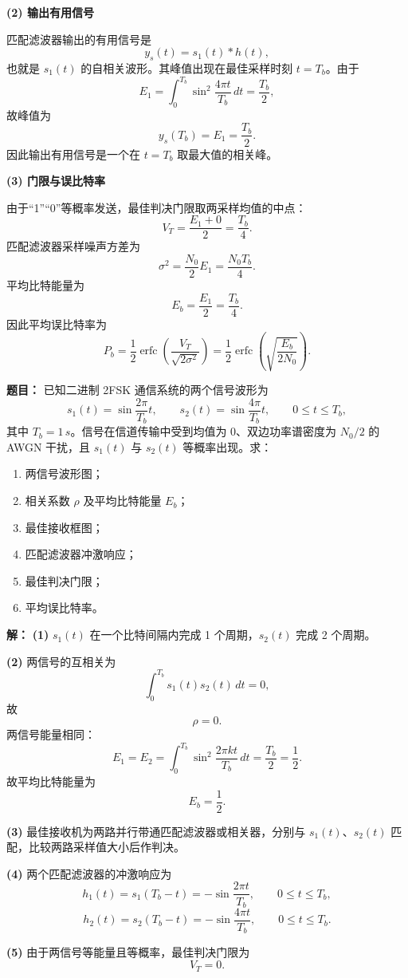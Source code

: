 \textbf{(2) 输出有用信号}\par
匹配滤波器输出的有用信号是
\[
y_s(t)=s_1(t)*h(t),
\]
也就是 $s_1(t)$ 的自相关波形。其峰值出现在最佳采样时刻 $t=T_b$。由于
\[
E_1=\int_0^{T_b}\sin^2\frac{4\pi t}{T_b}\,dt=\frac{T_b}{2},
\]
故峰值为
\[
y_s(T_b)=E_1=\frac{T_b}{2}.
\]
因此输出有用信号是一个在 $t=T_b$ 取最大值的相关峰。

\textbf{(3) 门限与误比特率}\par
由于“1”“0”等概率发送，最佳判决门限取两采样均值的中点：
\[
V_T=\frac{E_1+0}{2}=\frac{T_b}{4}.
\]
匹配滤波器采样噪声方差为
\[
\sigma^2=\frac{N_0}{2}E_1=\frac{N_0T_b}{4}.
\]
平均比特能量为
\[
E_b=\frac{E_1}{2}=\frac{T_b}{4}.
\]
因此平均误比特率为
\[
P_b=\frac12\operatorname{erfc}\!\left(\frac{V_T}{\sqrt{2\sigma^2}}\right)
=\frac12\operatorname{erfc}\!\left(\sqrt{\frac{E_b}{2N_0}}\right).
\]

\medskip
{}
\textbf{题目：}
已知二进制 2FSK 通信系统的两个信号波形为
\[
s_1(t)=\sin\frac{2\pi}{T_b}t,\qquad
s_2(t)=\sin\frac{4\pi}{T_b}t,
\qquad 0\le t\le T_b,
\]
其中 $T_b=1\,s$。信号在信道传输中受到均值为 $0$、双边功率谱密度为 $N_0/2$ 的 AWGN 干扰，且 $s_1(t)$ 与 $s_2(t)$ 等概率出现。求：
\begin{enumerate}
\item 两信号波形图；
\item 相关系数 $\rho$ 及平均比特能量 $E_b$；
\item 最佳接收框图；
\item 匹配滤波器冲激响应；
\item 最佳判决门限；
\item 平均误比特率。
\end{enumerate}

\par\textbf{解：}
\textbf{(1)} $s_1(t)$ 在一个比特间隔内完成 1 个周期，$s_2(t)$ 完成 2 个周期。

\textbf{(2)} 两信号的互相关为
\[
\int_0^{T_b}s_1(t)s_2(t)\,dt=0,
\]
故
\[
\rho=0.
\]
两信号能量相同：
\[
E_1=E_2=\int_0^{T_b}\sin^2\frac{2\pi kt}{T_b}\,dt=\frac{T_b}{2}=\frac12.
\]
故平均比特能量为
\[
E_b=\frac12.
\]

\textbf{(3)} 最佳接收机为两路并行带通匹配滤波器或相关器，分别与 $s_1(t)$、$s_2(t)$ 匹配，比较两路采样值大小后作判决。

\textbf{(4)} 两个匹配滤波器的冲激响应为
\[
h_1(t)=s_1(T_b-t)= -\sin\frac{2\pi t}{T_b},\qquad 0\le t\le T_b,
\]
\[
h_2(t)=s_2(T_b-t)= -\sin\frac{4\pi t}{T_b},\qquad 0\le t\le T_b.
\]

\textbf{(5)} 由于两信号等能量且等概率，最佳判决门限为
\[
V_T=0.
\]


